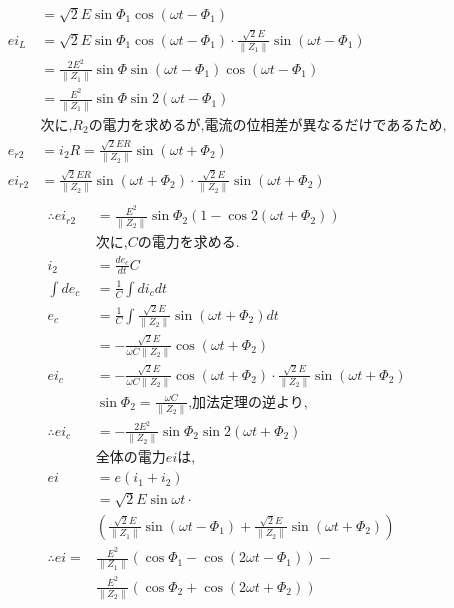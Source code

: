 \documentclass[twocolumn]{article}
\begin{document}
\begin{enumerate}
\begin{align*}
              &= \sqrt{2}E\sin \Phi_1 \cos \left( \omega t - \Phi_1 \right)\\
          ei_L  &= \sqrt{2}E\sin \Phi_1 \cos \left( \omega t - \Phi_1 \right) \cdot \frac{\sqrt{2}E}{\|Z_1\|} \sin \left(\omega t - \Phi_1\right)\\
                &= \frac{2E^2}{\|Z_1\|}\sin\Phi \sin \left( \omega t - \Phi_1\right)\cos \left( \omega t - \Phi_1\right)\\
                &= \frac{E^2}{\|Z_1\|}\sin\Phi \sin2\left( \omega t - \Phi_1\right)\\
          &\text{次に,}R_2\text{の電力を求めるが,電流の位相差が異なるだけであるため,}\\
          e_{r2} &= i_2R = \frac{\sqrt{2}ER}{\|Z_2\|}\sin\left(\omega t + \Phi_2\right)\\
          ei_{r2} &= \frac{\sqrt{2}ER}{\|Z_2\|}\sin\left(\omega t + \Phi_2\right) \cdot \frac{\sqrt{2}E}{\|Z_2\|} \sin \left(\omega t + \Phi_2\right)\\          
\end{align*}
\begin{align*}
  \therefore ei_{r2} &= \frac{E^2}{\|Z_2\|}\sin\Phi_2 \left(1 - \cos 2 \left(\omega t + \Phi_2\right)\right)\\
          &\text{次に,}C\text{の電力を求める.}\\
          i_2 &= \frac{de_c}{dt}C\\
          \int de_c &= \frac{1}{C} \int di_c dt\\
          e_c   &= \frac{1}{C} \int \frac{\sqrt{2}E}{\|Z_2\|}\sin \left( \omega t + \Phi_2\right) dt\\
                &= -\frac{\sqrt{2}E}{\omega C\|Z_2\|} \cos \left( \omega t + \Phi_2\right)\\
          ei_c  &= -\frac{\sqrt{2}E}{\omega C\|Z_2\|} \cos \left( \omega t + \Phi_2\right) \cdot \frac{\sqrt{2}E}{\|Z_2\|}\sin \left( \omega t + \Phi_2\right)\\
          &\sin \Phi_2 = \frac{\omega C}{\|Z_2\|}\text{,加法定理の逆より,}\\
\therefore ei_c &= -\frac{2E^2}{\|Z_2\|}\sin \Phi_2 \sin 2\left(\omega t + \Phi_2\right)\\
          &\text{全体の電力}ei\text{は,}\\
          ei  &= e\left(i_1 + i_2\right)\\
              &= \sqrt{2}E\sin\omega t \cdot \\
              & \left(\frac{\sqrt{2}E}{\|Z_1\|}\sin\left(\omega t - \Phi_1\right) +  \frac{\sqrt{2}E}{\|Z_2\|}\sin\left(\omega t + \Phi_2\right)\right)\\
\therefore ei     =&\frac{E^2}{\|Z_1\|}\left(\cos\Phi_1 - \cos\left(2\omega t - \Phi_1\right)\right) -\\
                 &\frac{E^2}{\|Z_2\|}\left(\cos\Phi_2 + \cos\left(2\omega t + \Phi_2\right)\right)\\
\end{align*}

\end{enumerate}
\end{document}
